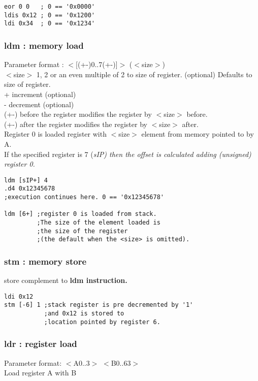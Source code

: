 \documentclass[a4paper,11pt]{article}
\begin{document}
\begin{verbatim}
eor 0 0   ; 0 == '0x0000'
ldis 0x12 ; 0 == '0x1200'
ldi 0x34  ; 0 == '0x1234'
\end{verbatim}

\subsubsection{ldm : memory load} 
 Parameter format : $<$[(+-)0..7(+-)]$>$ ($<$size$>$)\\
 $<$size$>$ 1, 2 or an even multiple of 2 to size of register. (optional) Defaults to size of register.\\
 + increment (optional)\\
 - decrement (optional)\\
 (+-) before the register modifies the register by $<$size$>$ before.\\
 (+-) after the register modifies the register by $<$size$>$ after.\\
 
 Register 0 is loaded register with $<$size$>$ element from memory pointed to by A.\\
 
 If the specified register is 7 (\sl sIP\rm) then the offset is calculated adding (unsigned) register 0.\\
 
\begin{verbatim}
ldm [sIP+] 4
.d4 0x12345678
;execution continues here. 0 == '0x12345678'

ldm [6+] ;register 0 is loaded from stack. 
         ;The size of the element loaded is
         ;the size of the register 
         ;(the default when the <size> is omitted).
\end{verbatim}
  
\subsubsection{stm : memory store}
 store complement to \bf ldm \rm instruction.

\begin{verbatim}
ldi 0x12
stm [-6] 1 ;stack register is pre decremented by '1' 
           ;and 0x12 is stored to 
           ;location pointed by register 6.
\end{verbatim}

\subsubsection{ldr : register load} 
 Parameter format: $<$A0..3$>$ $<$B0..63$>$\\
 Load register A with B
\end{document}
